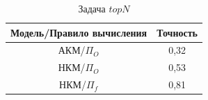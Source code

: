 \begin{table}[htb]
	\caption{Задача $topN$}
  \begin{center}
	\label{table:topn}
	\begin{tabular}{|c|c|}
	  \hline
		Модель/Правило вычисления & Точность \\ \hline
		АКМ/$\Pi_{O}$&0,32 \\ \hline
		НКМ/$\Pi_{O}$&0,53 \\ \hline
		НКМ/$\Pi_{f}$&0,81 \\ \hline
	\end{tabular}
  \end{center}
\end{table}

